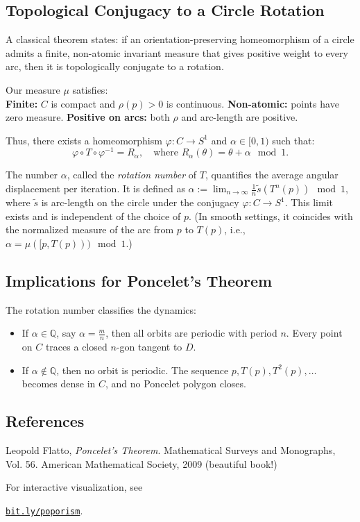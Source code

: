 \begin{technical}
\subsection*{Topological Conjugacy to a Circle Rotation}
A classical theorem states: if an orientation-preserving homeomorphism of a circle admits a finite, non-atomic invariant measure that gives positive weight to every arc, then it is topologically conjugate to a rotation.

Our measure \( \mu \) satisfies:\\
\textbf{Finite:} \( C \) is compact and \( \rho(p) > 0 \) is continuous. \textbf{Non-atomic:} points have zero measure. \textbf{Positive on arcs:} both \( \rho \) and arc-length are positive.

Thus, there exists a homeomorphism \( \varphi: C \to S^1 \) and \( \alpha \in [0,1) \) such that:
\[
\varphi \circ T \circ \varphi^{-1} = R_\alpha, \quad \text{where } R_\alpha(\theta) = \theta + \alpha \mod 1.
\]

The number \( \alpha \), called the \emph{rotation number} of \( T \), quantifies the average angular displacement per iteration. It is defined as $
\alpha := \lim_{n \to \infty} \frac{1}{n} \tilde{s}(T^n(p)) \mod 1$, where \( \tilde{s} \) is arc-length on the circle under the conjugacy \( \varphi: C \to S^1 \). This limit exists and is independent of the choice of \( p \). (In smooth settings, it coincides with the normalized measure of the arc from \( p \) to \( T(p) \), i.e., \( \alpha = \mu([p, T(p))) \mod 1 \).)

\subsection*{Implications for Poncelet’s Theorem}

The rotation number classifies the dynamics:
\begin{itemize}
  \item If \( \alpha \in \mathbb{Q} \), say \( \alpha = \frac{m}{n} \), then all orbits are periodic with period \( n \). Every point on \( C \) traces a closed \( n \)-gon tangent to \( D \).
  \item If \( \alpha \notin \mathbb{Q} \), then no orbit is periodic. The sequence \( p, T(p), T^2(p), \ldots \) becomes dense in \( C \), and no Poncelet polygon closes.
\end{itemize}

\subsection*{References}
Leopold Flatto, \textit{Poncelet’s Theorem}. Mathematical Surveys and Monographs, Vol. 56. American Mathematical Society, 2009 (beautiful book!)

For interactive visualization, see \par
  \href{https://bit.ly/poporism}{\texttt{bit.ly/poporism}}.
\end{technical}
